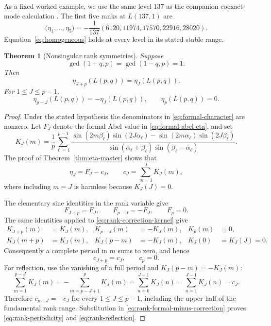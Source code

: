 \documentclass[11pt]{article}
\newtheorem{theorem}{Theorem}[section]
\theoremstyle{definition}
\begin{document}
As a fixed worked example, we use the same level $137$ as the companion
coexact-mode calculation \cite{Mahmood2026CoexactHydrodynamics}.  The first
five ranks at $L(137,1)$ are
\begin{equation}
 \bigl(\eta_1,\ldots,\eta_5\bigr)
 =-\frac1{137}(6120,11974,17570,22916,28020).
 \label{eq:level137-table}
\end{equation}
Equation~\eqref{eq:homogeneous} holds at every level in its stated stable
range.

\begin{theorem}[Nonsingular rank symmetries]
\label{cor:rank-symmetry}
Suppose
\[
 \gcd(1+q,p)=\gcd(1-q,p)=1.
\]
Then
\begin{equation}
 \eta_{J+p}(L(p,q))=\eta_J(L(p,q)).
 \label{eq:rank-periodicity}
\end{equation}
For $1\leq J\leq p-1$,
\begin{equation}
 \eta_{p-J}(L(p,q))=-\eta_J(L(p,q)),
 \qquad
 \eta_p(L(p,q))=0.
 \label{eq:rank-reflection}
\end{equation}
\end{theorem}

\begin{proof}
Under the stated hypothesis the denominators in
\eqref{eq:formal-character} are nonzero.  Let $F_J$ denote the formal Abel
value in \eqref{eq:formal-abel-eta}, and set
\begin{equation}
 K_J(m)=\frac1p\sum_{\ell=1}^{p-1}
 \frac{
  \sin(2m\beta_\ell)\sin(2J\alpha_\ell)
  -\sin(2m\alpha_\ell)\sin(2J\beta_\ell)}
 {\sin(\alpha_\ell+\beta_\ell)
  \sin(\beta_\ell-\alpha_\ell)}.
 \label{eq:rank-correction-kernel}
\end{equation}
The proof of Theorem~\ref{thm:eta-master} shows that
\begin{equation}
 \eta_J=F_J-c_J,
 \qquad c_J=\sum_{m=1}^{J}K_J(m),
 \label{eq:rank-formal-minus-correction}
\end{equation}
where including $m=J$ is harmless because $K_J(J)=0$.

The elementary sine identities in the rank variable give
\[
 F_{J+p}=F_J,\qquad F_{p-J}=-F_J,\qquad F_p=0.
\]
The same identities applied to \eqref{eq:rank-correction-kernel} give
\begin{align*}
 K_{J+p}(m)&=K_J(m),&K_{p-J}(m)&=-K_J(m),&K_p(m)&=0,\\
 K_J(m+p)&=K_J(m),&K_J(p-m)&=-K_J(m),&
 K_J(0)&=K_J(J)=0.
\end{align*}
Consequently a complete period in $m$ sums to zero, and hence
\[
 c_{J+p}=c_J,\qquad c_p=0.
\]
For reflection, use the vanishing of a full period and
$K_J(p-m)=-K_J(m)$:
\[
 \sum_{m=1}^{p-J}K_J(m)
 =-\sum_{m=p-J+1}^{p}K_J(m)
 =\sum_{n=0}^{J-1}K_J(n)
 =\sum_{n=1}^{J-1}K_J(n)=c_J.
\]
Therefore $c_{p-J}=-c_J$ for every $1\leq J\leq p-1$, including the
upper half of the fundamental rank range.
Substitution in \eqref{eq:rank-formal-minus-correction} proves
\eqref{eq:rank-periodicity} and \eqref{eq:rank-reflection}.
\end{proof}
\end{document}
